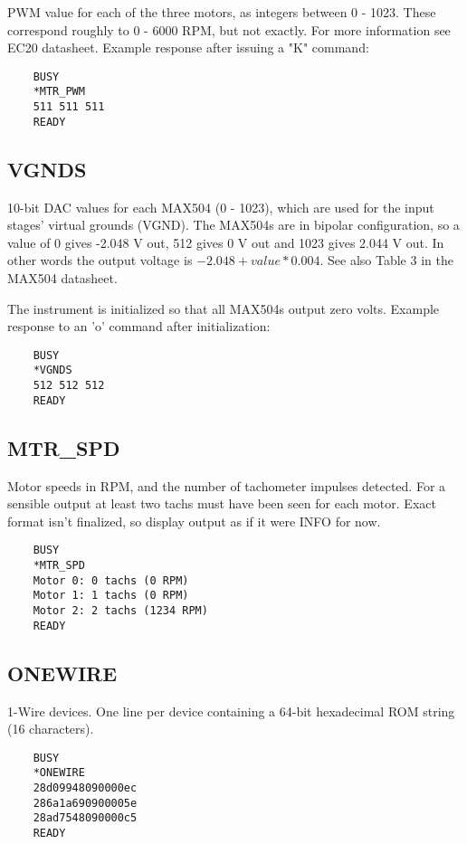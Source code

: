 \documentclass{article}
\begin{document}
PWM value for each of the three motors, as integers between 0 - 1023.
These correspond roughly to 0 - 6000 RPM, but not exactly.
For more information see EC20 datasheet.
Example response after issuing a "K" command:

\begin{lstlisting}
    BUSY
    *MTR_PWM
    511 511 511
    READY
\end{lstlisting}

\subsection{VGNDS}

10-bit DAC values for each MAX504 (0 - 1023), which are used for the input stages' virtual grounds (VGND).
The MAX504s are in bipolar configuration,
so a value of 0 gives -2.048 V out, 512 gives 0 V out and 1023 gives 2.044 V out.
In other words the output voltage is $-2.048 + value*0.004$.
See also Table 3 in the MAX504 datasheet.

The instrument is initialized so that all MAX504s output zero volts.
Example response to an 'o' command after initialization:

\begin{lstlisting}
    BUSY
    *VGNDS
    512 512 512
    READY
\end{lstlisting}

\subsection{MTR\_SPD}

Motor speeds in RPM, and the number of tachometer impulses detected.
For a sensible output at least two tachs must have been seen for each motor.
Exact format isn't finalized, so display output as if it were INFO for now.

\begin{lstlisting}
    BUSY
    *MTR_SPD
    Motor 0: 0 tachs (0 RPM)
    Motor 1: 1 tachs (0 RPM)
    Motor 2: 2 tachs (1234 RPM)
    READY
\end{lstlisting}

\subsection{ONEWIRE}

1-Wire devices.
One line per device containing a 64-bit hexadecimal ROM string (16 characters).

\begin{lstlisting}
    BUSY
    *ONEWIRE
    28d09948090000ec
    286a1a690900005e
    28ad7548090000c5
    READY
\end{lstlisting}
\end{document}
